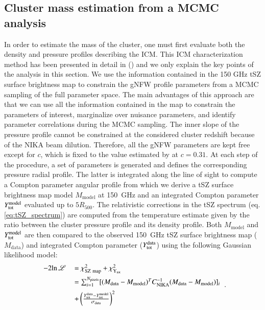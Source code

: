 \documentclass[traditabstract]{aa}
\begin{document}
\subsection{Cluster mass estimation from a MCMC analysis}\label{sec:MCMC_old}
In order to estimate the mass of the cluster, one must first evaluate both the density and pressure profiles describing the ICM. This ICM characterization method has been presented in detail in (\citealt{CLJ1227NIKA}) and we only explain the key points of the analysis in this section. We use the information contained in the 150 GHz tSZ surface brightness map to constrain the gNFW profile parameters  from a MCMC sampling of the full parameter space. The main advantages of this approach are that we can use all the information contained in the map to constrain the parameters of interest, marginalize over nuisance parameters, and identify parameter correlations during the MCMC sampling. The inner slope of the pressure profile cannot be constrained at the considered cluster redshift because of the NIKA beam dilution. Therefore, all the gNFW parameters are kept free except for $c$, which is 
fixed to the value estimated by \citealt{Planck_pressure_prof} at $c=0.31$. At each step of the procedure, a set of parameters is generated and defines the corresponding pressure radial profile. The latter is integrated along the line of sight to compute a Compton parameter angular profile from which we derive a tSZ surface brightness map model $M_{\mathrm{model}}$ at 150~GHz and an integrated Compton parameter $Y_{\rm{tot}}^{\rm{model}}$ evaluated up to $5R_{500}$. The relativistic corrections in the tSZ spectrum (eq. \ref{eq:tSZ_spectrum}) are computed from the temperature estimate given by the ratio between the cluster pressure profile and its density profile. Both $M_{\mathrm{model}}$ and $Y_{\rm{tot}}^{\rm{model}}$ are then compared to the observed 150~GHz tSZ surface brightness map ($M_{\mathrm{data}}$) and integrated Compton parameter ($Y_{\rm{tot}}^{\rm{data}}$) using the following Gaussian likelihood model:
\begin{equation}
\begin{tabular}{rl}
        $-2 \mathrm{ln} \, \mathscr{L} $  & $ =\chi^2_{\mathrm{SZ~map}} + \chi^2_{\mathrm{Y_{tot}}}$\\[0.2cm]
         &$ =\sum_{i=1}^{N_{\mathrm{pixels}}} [(M_{\mathrm{data}} - M_{\mathrm{model}})^T C_{\mathrm{NIKA}}^{-1} (M_{\mathrm{data}} - M_{\mathrm{model}})]_i $ \\[0.2cm]
         & $+ \left( \frac{Y_{\rm{tot}}^{\rm{data}} - Y_{\rm{tot}}^{\rm{model}}}{\sigma_{\mathrm{data}}} \right)^2$
\label{eq:likelihood}
\end{tabular}
.\end{equation}
\end{document}
